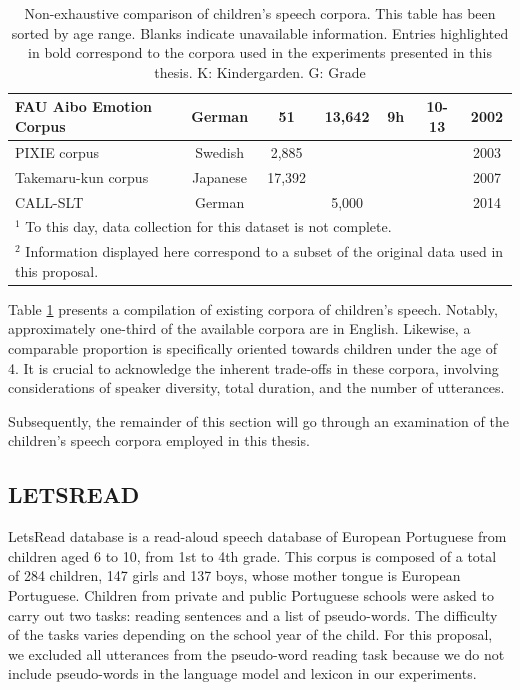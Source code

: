 \begin{table}
\begin{tabular}{l|c|c|c|c|c|c}
\hline
FAU Aibo Emotion Corpus \cite{steidl2009automatic} & German & 51 & 13,642 & 9h & 10-13 & 2002 \\ 
\hline
PIXIE corpus \cite{bell2003child} & Swedish & 2,885 &  &  &  & 2003 \\ 
\hline
Takemaru-kun corpus \cite{takemaru} & Japanese & 17,392 &  &  & & 2007 \\ 
\hline
CALL-SLT \cite{callslt} & German &  & 5,000 &  &  & 2014 \\ 
\hline
\multicolumn{7}{l}{$^1$ To this day, data collection for this dataset is not complete.} \\
\multicolumn{7}{l}{$^2$ Information displayed here correspond to a subset of the original data used in this proposal.}  \\
\end{tabular}
\caption{Non-exhaustive comparison of children's speech corpora. This table has been sorted by age range. Blanks indicate unavailable information. Entries highlighted in bold correspond to the corpora used in the experiments presented in this thesis. K: Kindergarden. G: Grade}
\label{table:children_corpora}
\end{table}

Table \ref{table:children_corpora} presents a compilation of existing corpora of children's speech. Notably, approximately one-third of the available corpora are in English. Likewise, a comparable proportion is specifically oriented towards children under the age of 4. It is crucial to acknowledge the inherent trade-offs in these corpora, involving considerations of speaker diversity, total duration, and the number of utterances.

Subsequently, the remainder of this section will go through an examination of the children's speech corpora employed in this thesis.


\subsection{LETSREAD}
LetsRead database \cite{letsread} is a read-aloud speech database of European Portuguese from children aged 6 to 10,  from 1st to 4th grade. This corpus is composed of a total of 284 children, 147 girls and 137 boys, whose mother tongue is European Portuguese. Children from private and public Portuguese schools were asked to carry out two tasks: reading sentences and a list of pseudo-words. The difficulty of the tasks varies depending on the school year of the child. 
For this proposal, we excluded all utterances from the pseudo-word reading task because we do not include pseudo-words in the language model and lexicon in our experiments. 
